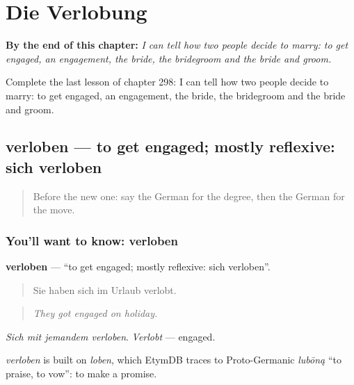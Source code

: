 
\chapter{Die Verlobung}
\label{ch:ge-die-verlobung}

\begin{chapteropening}
\textbf{By the end of this chapter:} \emph{I can tell how two people decide to marry: to get engaged, an engagement, the bride, the bridegroom and the bride and groom.}

Complete the last lesson of chapter 298: I can tell how two people decide to marry: to get engaged, an engagement, the bride, the bridegroom and the bride and groom.
\end{chapteropening}

\section[verloben]{verloben — to get engaged; mostly reflexive: sich verloben}

\label{lesson:GE-C298-verloben}



\begin{quote}
Before the new one: say the German for the degree, then the German for the move.
\end{quote}

\subsection*{You'll want to know: verloben}
\textbf{verloben} — \textquotedblleft{}to get engaged; mostly reflexive: sich verloben\textquotedblright{}.

\begin{quote}
Sie haben sich im Urlaub verlobt.
\end{quote}

\begin{quote}
\emph{They got engaged on holiday.}
\end{quote}

\emph{Sich mit jemandem verloben}. \emph{Verlobt} — engaged.

\begin{cousinweb}
\emph{verloben} is built on \emph{loben}, which EtymDB traces to Proto-Germanic \emph{lubōną} \textquotedblleft{}to praise, to vow\textquotedblright{}: to make a promise.
\end{cousinweb}

